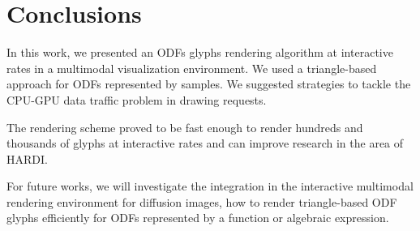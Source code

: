 \documentclass[twoside,twocolumn,10pt]{article}
\begin{document}




\section{Conclusions}
\label{sec::conclusions}

In this work, we presented an ODFs glyphs rendering algorithm at interactive rates in a multimodal visualization environment. We used a triangle-based approach for ODFs represented by samples. We suggested strategies to tackle the  CPU-GPU data traffic problem in drawing requests.

The rendering scheme proved to be fast enough to render hundreds and thousands of glyphs at interactive rates and can improve research in the area of HARDI.



For future works, we will investigate the integration in the interactive multimodal rendering environment for diffusion images, how to render triangle-based ODF glyphs efficiently for ODFs represented by a function or algebraic expression.














\end{document}
